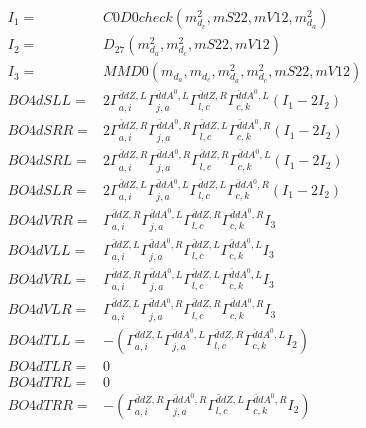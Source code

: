 \documentclass[A4,landscape]{article}
\begin{document}
\begin{align} 
I_1 = & C0D0check(m^2_{d_{{c}}}, mS22, mV12, m^2_{d_{{a}}}) \\ 
I_2 = & D_{27}(m^2_{d_{{a}}}, m^2_{d_{{c}}}, mS22, mV12) \\ 
I_3 = & MMD0(m_{d_{{a}}}, m_{d_{{c}}}, m^2_{d_{{a}}}, m^2_{d_{{c}}}, mS22, mV12) \\ 
  BO4dSLL= & 2  \Gamma^{\bar{d}d Z ,L}_{a, i} \Gamma^{\bar{d}d A^0 ,L}_{j, a} \Gamma^{\bar{d}d Z ,R}_{l, c} \Gamma^{\bar{d}d A^0 ,L}_{c, k} (I_1 - 2 I_2) \\ 
  BO4dSRR= & 2  \Gamma^{\bar{d}d Z ,R}_{a, i} \Gamma^{\bar{d}d A^0 ,R}_{j, a} \Gamma^{\bar{d}d Z ,L}_{l, c} \Gamma^{\bar{d}d A^0 ,R}_{c, k} (I_1 - 2 I_2) \\ 
  BO4dSRL= & 2  \Gamma^{\bar{d}d Z ,R}_{a, i} \Gamma^{\bar{d}d A^0 ,R}_{j, a} \Gamma^{\bar{d}d Z ,R}_{l, c} \Gamma^{\bar{d}d A^0 ,L}_{c, k} (I_1 - 2 I_2) \\ 
  BO4dSLR= & 2  \Gamma^{\bar{d}d Z ,L}_{a, i} \Gamma^{\bar{d}d A^0 ,L}_{j, a} \Gamma^{\bar{d}d Z ,L}_{l, c} \Gamma^{\bar{d}d A^0 ,R}_{c, k} (I_1 - 2 I_2) \\ 
  BO4dVRR= &  \Gamma^{\bar{d}d Z ,R}_{a, i} \Gamma^{\bar{d}d A^0 ,L}_{j, a} \Gamma^{\bar{d}d Z ,R}_{l, c} \Gamma^{\bar{d}d A^0 ,R}_{c, k} I_3 \\ 
  BO4dVLL= &  \Gamma^{\bar{d}d Z ,L}_{a, i} \Gamma^{\bar{d}d A^0 ,R}_{j, a} \Gamma^{\bar{d}d Z ,L}_{l, c} \Gamma^{\bar{d}d A^0 ,L}_{c, k} I_3 \\ 
  BO4dVRL= &  \Gamma^{\bar{d}d Z ,R}_{a, i} \Gamma^{\bar{d}d A^0 ,L}_{j, a} \Gamma^{\bar{d}d Z ,L}_{l, c} \Gamma^{\bar{d}d A^0 ,L}_{c, k} I_3 \\ 
  BO4dVLR= &  \Gamma^{\bar{d}d Z ,L}_{a, i} \Gamma^{\bar{d}d A^0 ,R}_{j, a} \Gamma^{\bar{d}d Z ,R}_{l, c} \Gamma^{\bar{d}d A^0 ,R}_{c, k} I_3 \\ 
  BO4dTLL= & -( \Gamma^{\bar{d}d Z ,L}_{a, i} \Gamma^{\bar{d}d A^0 ,L}_{j, a} \Gamma^{\bar{d}d Z ,R}_{l, c} \Gamma^{\bar{d}d A^0 ,L}_{c, k} I_2) \\ 
  BO4dTLR= & 0 \\ 
  BO4dTRL= & 0 \\ 
  BO4dTRR= & -( \Gamma^{\bar{d}d Z ,R}_{a, i} \Gamma^{\bar{d}d A^0 ,R}_{j, a} \Gamma^{\bar{d}d Z ,L}_{l, c} \Gamma^{\bar{d}d A^0 ,R}_{c, k} I_2) \\ 
\end{align} 
\end{document}
